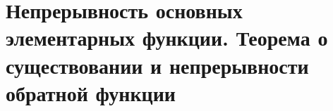 \section{Непрерывность основных элементарных функции. Теорема о существовании и непрерывности обратной функции}